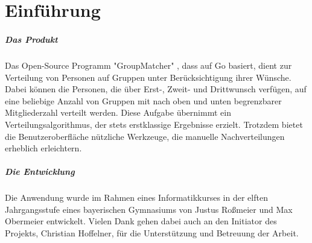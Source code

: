 \chapter{Einführung}
\label{ch:einführung}

\paragraph{Das Produkt} Das Open-Source Programm "GroupMatcher" , dass auf Go basiert, dient zur Verteilung von Personen auf Gruppen unter Berücksichtigung ihrer Wünsche. Dabei können die Personen, die über Erst-, Zweit- und Drittwunsch verfügen, auf eine beliebige Anzahl von Gruppen mit nach oben und unten begrenzbarer Mitgliederzahl verteilt werden. Diese Aufgabe übernimmt ein Verteilungsalgorithmus, der stets erstklassige Ergebnisse erzielt. Trotzdem bietet die Benutzeroberfläche nützliche Werkzeuge, die manuelle Nachverteilungen erheblich erleichtern.
\paragraph{Die Entwicklung} Die Anwendung wurde im Rahmen eines Informatikkurses in der elften Jahrgangsstufe eines bayerischen Gymnasiums von Justus Roßmeier und Max Obermeier entwickelt. Vielen Dank gehen dabei auch an den Initiator des Projekts, Christian Hoffelner, für die Unterstützung und Betreuung der Arbeit.
